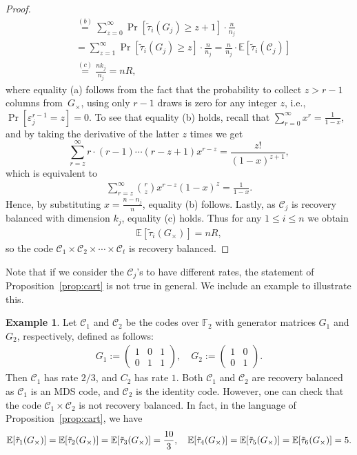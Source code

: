 \documentclass[11pt,a4paper,reqno,twoside]{amsart}
\theoremstyle{definition}
\newtheorem{example}{Example}
\newcommand{\F}{\mathbb{F}}
\newcommand{\E}{\mathbb{E}}
\newcommand{\mC}{\mathcal{C}}
\begin{document}
\begin{proof}
\begin{align*}
& \stackrel{(b)}{=} \sum_{z=0}^\infty \Pr \left[ \widetilde{\tau}_i (G_j ) \ge z+1 \right]  \cdot\frac{n}{n_j}  \\ 
& = \sum_{z=1}^{\infty} \Pr \left[ \widetilde{\tau}_i (G_j) \ge z \right] \cdot \frac{n}{n_j} = \frac{n}{n_j} \cdot \E \left[ \widetilde{\tau}_i (\mC_j) \right] \\
& \stackrel{(c)}{=} \frac{nk_j}{n_j}=nR,
\end{align*}
where equality (a) follows from the fact that the probability to collect $z>r-1$ columns from~$G_{\times }$, using only $r-1$ draws is zero for any integer $z$, i.e., $\Pr[\varepsilon_j^{r-1}=z]=0$.  
To see that equality (b) holds, recall that $\sum_{r=0}^\infty x^r=\frac{1}{1-x}$, and by taking the derivative of the latter $z$ times we get $$\sum_{r=z}^\infty r\cdot(r-1)\cdots(r-z+1)x^{r-z}=\frac{z!}{(1-x)^{z+1}},$$ which is equivalent to 
\begin{align}\label{eq:binomsums}
    \sum_{r=z}^\infty \binom{r}{z}x^{r-z}(1-x)^{z} = \frac{1}{1-x}.
\end{align}
Hence, by substituting $x=\frac{n-n_j}{n}$, equality (b) follows. Lastly, as $\mC_j$ is recovery balanced with dimension $k_j$, equality (c) holds. 
Thus for any $1\le i\le n$ we obtain 
\begin{align*}
    \E [\widetilde{\tau}_i (G_{\times})] = nR,
\end{align*}
 so the code $\mC_1 \times \mC_2 \times \cdots \times \mC_t$ is recovery balanced.
\end{proof}

Note that if we consider the  $\mC_j$'s to have different rates, the statement of Proposition~\ref{prop:cart} is not true in general. We include an example to illustrate this.
\begin{example}
    Let $\mC_1$ and $\mC_2$ be the codes over $\F_2$ with generator matrices $G_1$ and $G_2$, respectively, defined as follows:
    \begin{align*}
        G_1 := \begin{pmatrix}
            1 & 0 & 1 \\
            0 & 1 & 1
        \end{pmatrix}, \quad 
        G_2 := \begin{pmatrix}
            1 & 0  \\
            0 & 1
        \end{pmatrix}.
    \end{align*}
    Then $\mC_1$ has rate $2/3$, and $C_2$ has rate $1$. Both $\mC_1$ and $\mC_2$ are recovery balanced  as $\mC_1$ is an MDS code, and $\mC_2$ is the identity code. However, one can check that the code $\mC_1 \times \mC_2$ is not recovery balanced. In fact, in the language of Proposition~\ref{prop:cart}, we have
    \begin{align*}
        \E[\Tilde{\tau}_1(G_{\times})] = \E[\Tilde{\tau}_2(G_{\times})] = \E[\Tilde{\tau}_3(G_{\times})] = \frac{10}{3}, \quad \E[\Tilde{\tau}_4(G_{\times})] = \E[\Tilde{\tau}_5(G_{\times})] = \E[\Tilde{\tau}_6(G_{\times})] = 5.
    \end{align*}
\end{example}
\end{document}
